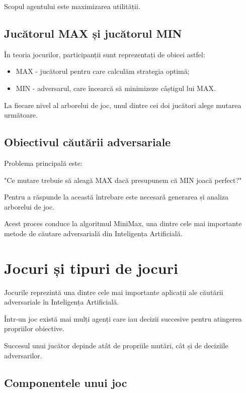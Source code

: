 \documentclass[12pt,a4paper]{article}
\begin{document}
Scopul agentului este maximizarea utilității.

\subsection{Jucătorul MAX și jucătorul MIN}

În teoria jocurilor, participanții sunt reprezentați de obicei astfel:

\begin{itemize}
\item MAX - jucătorul pentru care calculăm strategia optimă;
\item MIN - adversarul, care încearcă să minimizeze câștigul lui MAX.
\end{itemize}

La fiecare nivel al arborelui de joc, unul dintre cei doi jucători alege mutarea următoare.

\subsection{Obiectivul căutării adversariale}

Problema principală este:

\begin{center}
"Ce mutare trebuie să aleagă MAX dacă presupunem că MIN joacă perfect?"
\end{center}

Pentru a răspunde la această întrebare este necesară generarea și analiza arborelui de joc.

Acest proces conduce la algoritmul MiniMax, una dintre cele mai importante metode de căutare adversarială din Inteligența Artificială.








\section{Jocuri și tipuri de jocuri}

Jocurile reprezintă una dintre cele mai importante aplicații ale căutării adversariale în Inteligența Artificială.

Într-un joc există mai mulți agenți care iau decizii succesive pentru atingerea propriilor obiective.

Succesul unui jucător depinde atât de propriile mutări, cât și de deciziile adversarilor.

\subsection{Componentele unui joc}
\end{document}
